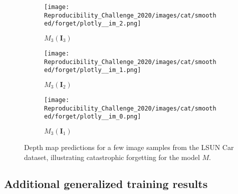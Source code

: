 \begin{figure}[!htb]
\begin{subfigure}{0.33\textwidth}
    \centering
    \texttt{[image: Reproducibility\_Challenge\_2020/images/cat/smoothed/forget/plotly\_\_im\_2.png]}
    \caption{$M_{3}(\mathbf{I}_{3})$}
    \label{}
\end{subfigure}
\begin{subfigure}{0.33\textwidth}
    \centering
    \texttt{[image: Reproducibility\_Challenge\_2020/images/cat/smoothed/forget/plotly\_\_im\_1.png]}
    \caption{$M_{3}(\mathbf{I}_2)$}
    \label{}
\end{subfigure}
\begin{subfigure}{0.33\textwidth}
    \centering
    \texttt{[image: Reproducibility\_Challenge\_2020/images/cat/smoothed/forget/plotly\_\_im\_0.png]}
    \caption{$M_{3}(\mathbf{I}_1)$}
    \label{}
\end{subfigure}
    \caption{Depth map predictions for a few image samples from the LSUN Car dataset, illustrating catastrophic forgetting for the model $M$. }
    \label{fig:forget_cat}
\end{figure}

\newpage

\subsection{Additional generalized training results}

